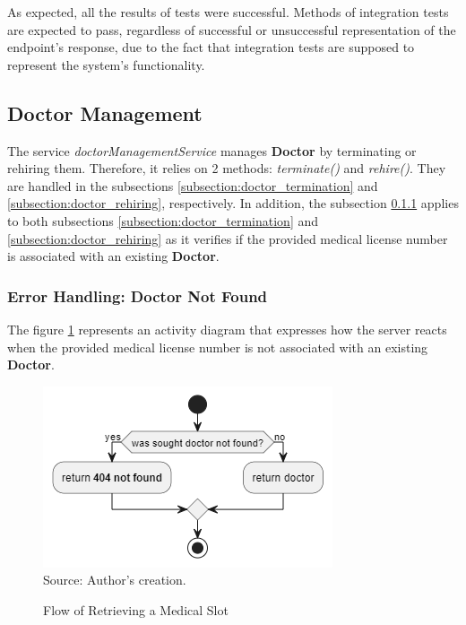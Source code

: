 As expected, all the results of tests were successful. Methods of integration tests are expected to pass, regardless of successful or unsuccessful representation of the endpoint's response, due to the fact that integration tests are supposed to represent the system's functionality.

\subsection{Doctor Management}

The service \textit{doctorManagementService} manages \textbf{Doctor} by terminating or rehiring them. Therefore, it relies on 2 methods: \textit{terminate()} and \textit{rehire()}. They are handled in the subsections \ref{subsection:doctor_termination} and \ref{subsection:doctor_rehiring}, respectively. In addition, the subsection \ref{subsection:doctor_not_found} applies to both subsections \ref{subsection:doctor_termination} and \ref{subsection:doctor_rehiring} as it verifies if the provided medical license number is associated with an existing \textbf{Doctor}.

\subsubsection{Error Handling: Doctor Not Found}
\label{subsection:doctor_not_found}

The figure \ref{fig:doctor_not_found_activity_diagram} represents an activity diagram that expresses how the server reacts when the provided medical license number is not associated with an existing \textbf{Doctor}.

\begin{figure}[H]
	\centering
	\caption{Flow of Retrieving a Medical Slot}
	\includegraphics[width=1\linewidth]{figures/doctor_not_found_activity_diagram.png}
	\\ \footnotesize Source: Author's creation.
	\label{fig:doctor_not_found_activity_diagram}
\end{figure}

